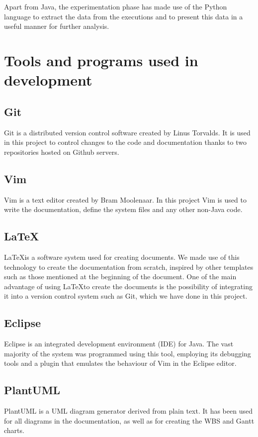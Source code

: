 Apart from Java, the experimentation phase has made use of the Python language to extract the data from the executions and to present this data in a useful manner for further analysis.

\section{Tools and programs used in development}

\subsection{Git}

Git is a distributed version control software created by Linus Torvalds. It is used in this project to control changes to the code and documentation thanks to two repositories hosted on Github servers. 

\subsection{Vim}

Vim is a text editor created by Bram Moolenaar. In this project Vim is used to write the documentation, define the system files and any other non-Java code.

\subsection{\LaTeX}

\LaTeX is a software system used for creating documents. We made use of this technology to create the documentation from scratch, inspired by other templates such as those mentioned at the beginning of the document. One of the main advantage of using \LaTeX to create the documents is the possibility of integrating it into a version control system such as Git, which we have done in this project. 

\subsection{Eclipse}

Eclipse is an integrated development environment (IDE) for Java. The vast majority of the system was programmed using this tool, employing its debugging tools and a plugin that emulates the behaviour of Vim in the Eclipse editor.

\subsection{PlantUML}

PlantUML is a UML diagram generator derived from plain text. It has been used for all diagrams in the documentation, as well as for creating the WBS and Gantt charts.


